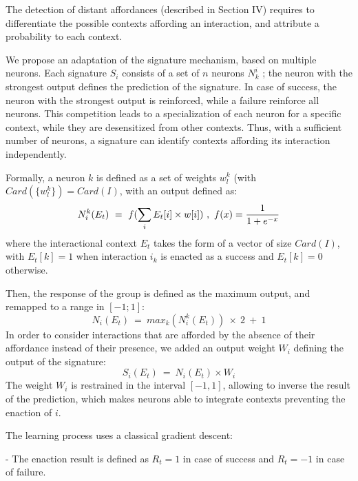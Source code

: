 \documentclass[conference]{IEEEtran}
\begin{document}
The detection of distant affordances (described in Section IV) requires to differentiate the possible contexts affording an interaction, and attribute a probability to each context.

We propose an adaptation of the signature mechanism, based on multiple neurons. Each signature $S_i$ consists of a set of $n$ neurons $N_k^i$ ; the neuron with the strongest output defines the prediction of the signature. In case of success, the neuron with the strongest output is reinforced, while a failure reinforce all neurons. This competition leads to a specialization of each neuron for a specific context, while they are desensitized from other contexts. Thus, with a sufficient number of neurons, a signature can identify contexts affording its interaction independently.

Formally, a neuron $k$ is defined as a set of weights $w_l^k$ (with $Card(\{w_l^k\})=Card(I)$, with an output defined as:
\begin{equation}
N_i^k(E_t)~=~f(\sum_{i} E_t[i] \times w[i])~,~ f(x) = { {1}\over{1+e^{-x} }}
\end{equation}
where the interactional context $E_t$ takes the form of a vector of size $Card(I)$, with $E_t[k]=1$ when interaction $i_k$ is enacted as a success and $E_t[k]=0$ otherwise.

Then, the response of the group is defined as the maximum output, and remapped to a range in $[-1;1]$:
\begin{equation}
N_i(E_t)~=~max_k (N_i^k(E_t) ) \: \times \: 2 ~+~ 1
\end{equation}
In order to consider interactions that are afforded by the absence of their affordance instead of their presence, we added an output weight $W_i$ defining the output of the signature:
\begin{equation}
S_i(E_t)~=~N_i(E_t) \times W_i
\end{equation}
The weight $W_i$ is restrained in the interval $[-1,1]$, allowing to inverse the result of the prediction, which makes neurons able to integrate contexts preventing the enaction of $i$.

The learning process uses a classical gradient descent:


- The enaction result is defined as $R_t=1$ in case of success and $R_t=-1$ in case of failure.
\end{document}
